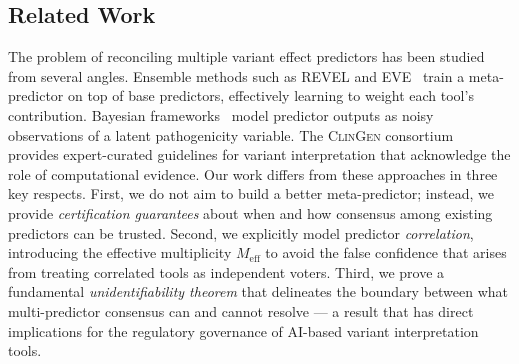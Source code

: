 \documentclass[11pt,a4paper]{article}
\theoremstyle{definition}
\newcommand{\REVEL}{\textsc{REVEL}}
\begin{document}
\subsection{Related Work}
The problem of reconciling multiple variant effect predictors has been studied from several angles.
Ensemble methods such as \REVEL{} and \textsc{EVE}~\cite{frazer2021disease} train a meta-predictor on top of base predictors, effectively learning to weight each tool's contribution.
Bayesian frameworks~\cite{rausell2024bayesian} model predictor outputs as noisy observations of a latent pathogenicity variable.
The \textsc{ClinGen} consortium~\cite{rehm2015clingen} provides expert-curated guidelines for variant interpretation that acknowledge the role of computational evidence.
Our work differs from these approaches in three key respects.
First, we do not aim to build a better meta-predictor; instead, we provide \textit{certification guarantees} about when and how consensus among existing predictors can be trusted.
Second, we explicitly model predictor \textit{correlation}, introducing the effective multiplicity $M_{\text{eff}}$ to avoid the false confidence that arises from treating correlated tools as independent voters.
Third, we prove a fundamental \textit{unidentifiability theorem} that delineates the boundary between what multi-predictor consensus can and cannot resolve — a result that has direct implications for the regulatory governance of AI-based variant interpretation tools.
\end{document}
